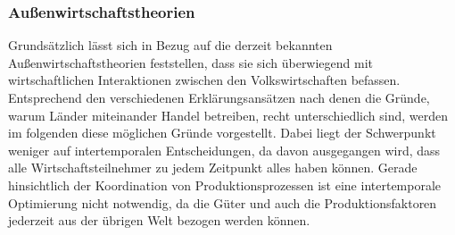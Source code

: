 \subsubsection{Außenwirtschaftstheorien}
Grundsätzlich lässt sich in Bezug auf die derzeit bekannten Außenwirtschaftstheorien feststellen, dass sie sich überwiegend mit wirtschaftlichen Interaktionen zwischen den Volkswirtschaften befassen.
Entsprechend den verschiedenen Erklärungsansätzen nach denen die Gründe, warum Länder miteinander Handel betreiben, recht unterschiedlich sind, werden im folgenden diese möglichen Gründe vorgestellt.
%
Dabei liegt der Schwerpunkt weniger auf intertemporalen Entscheidungen, da davon ausgegangen wird, dass alle Wirtschaftsteilnehmer zu jedem Zeitpunkt alles haben können. Gerade hinsichtlich der Koordination von Produktionsprozessen ist eine intertemporale Optimierung nicht notwendig, da die Güter und auch die Produktionsfaktoren jederzeit aus der übrigen Welt bezogen werden können.
%
